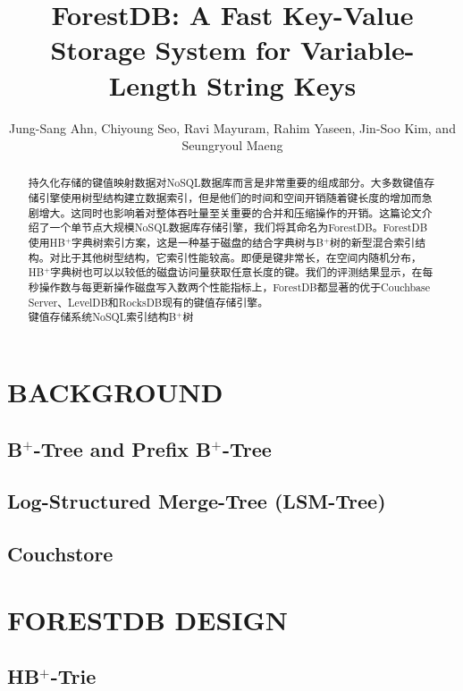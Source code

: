 \documentclass[lang=cn]{cls/elegantpaper}
\title{ForestDB: A Fast Key-Value Storage System for Variable-Length String Keys}
\author{Jung-Sang Ahn, Chiyoung Seo, Ravi Mayuram, Rahim Yaseen, Jin-Soo Kim, and Seungryoul Maeng}
\begin{document}
\maketitle

\begin{abstract}
\noindent \sffamily 持久化存储的键值映射数据对NoSQL数据库而言是非常重要的组成部分。大多数键值存储引擎使用树型结构建立数据索引，但是他们的时间和空间开销随着键长度的增加而急剧增大。这同时也影响着对整体吞吐量至关重要的合并和压缩操作的开销。这篇论文介绍了一个单节点大规模NoSQL数据库存储引擎，我们将其命名为ForestDB。ForestDB使用HB$^+$字典树索引方案，这是一种基于磁盘的结合字典树与B$^+$树的新型混合索引结构。对比于其他树型结构，它索引性能较高。即便是键非常长，在空间内随机分布，HB$^+$字典树也可以以较低的磁盘访问量获取任意长度的键。我们的评测结果显示，在每秒操作数与每更新操作磁盘写入数两个性能指标上，ForestDB都显著的优于Couchbase Server、LevelDB和RocksDB现有的键值存储引擎。\\

\noindent {} 键值存储系统\quad NoSQL\quad 索引结构\quad B$^+$树
\end{abstract}

\section{BACKGROUND}
      
\subsection{B$^+$-Tree and Prefix B$^+$-Tree}

\subsection{Log-Structured Merge-Tree (LSM-Tree)}

\subsection{Couchstore}

\section{FORESTDB DESIGN}

\subsection{HB$^+$-Trie}
\end{document}
